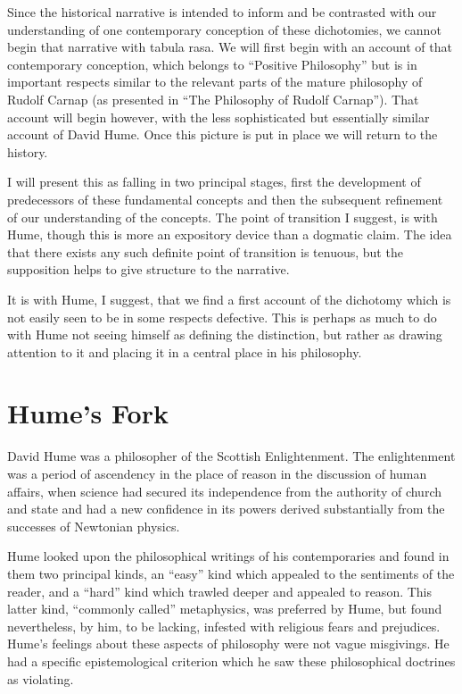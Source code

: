 Since the historical narrative is intended to inform and be contrasted
with our understanding of one contemporary conception of these
dichotomies, we cannot begin that narrative with tabula rasa.
We will first begin with an account of that contemporary conception,
which belongs to ``Positive Philosophy'' but is in important respects
similar to the relevant parts of the mature philosophy of Rudolf
Carnap (as presented in ``The Philosophy of Rudolf
Carnap''\cite{carnap63a}).
That account will begin however, with the less sophisticated but
essentially similar account of David Hume.
Once this picture is put in place we will return to the history.

I will present this as falling in two principal stages, first the
development of predecessors of these fundamental concepts and then the
subsequent refinement of our understanding of the concepts.
The point of transition I suggest, is with Hume, though this is more
an expository device than a dogmatic claim.
The idea that there exists any such definite point of transition is
tenuous, but the supposition helps to give structure to the narrative.

It is with Hume, I suggest, that we find a first account of the
dichotomy which is not easily seen to be in some respects defective. 
This is perhaps as much to do with Hume not seeing himself as defining
the distinction, but rather as drawing attention to it and placing it
in a central place in his philosophy. 

\section{Hume's Fork}\label{HumesFork}

David Hume was a philosopher of the Scottish Enlightenment.
The enlightenment was a period of ascendency in the place of reason in
the discussion of human affairs, when science had secured its
independence from the authority of church and state and had a new
confidence in its powers derived substantially from the successes of
Newtonian physics.

Hume looked upon the philosophical writings of his contemporaries and
found in them two principal kinds, an ``easy'' kind which appealed to
the sentiments of the reader, and a ``hard'' kind which trawled deeper
and appealed to reason.
This latter kind, ``commonly called'' metaphysics, was preferred by
Hume, but found nevertheless, by him, to be lacking, infested with religious 
fears and prejudices.
Hume's feelings about these aspects of philosophy were not vague
misgivings.
He had a specific epistemological criterion which he saw these
philosophical doctrines as violating.

